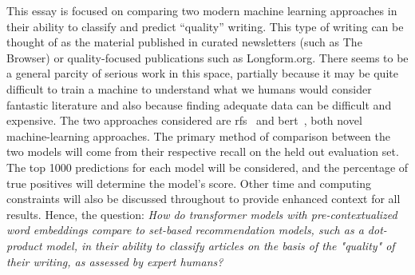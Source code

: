 This essay is focused on comparing two modern machine learning approaches in their ability to classify and predict “quality” writing. This type of writing can be thought of as the material published in curated newsletters (such as The Browser) or quality-focused publications such as Longform.org. There seems to be a general parcity of serious work in this space, partially because it may be quite difficult to train a machine to understand what we humans would consider fantastic literature and also because finding adequate data can be difficult and expensive. The two approaches considered are \gls{rfs}~\parencite{altosaar2020rankfromsets:} and \acrshort{bert}~\parencite{devlin2019bert:}, both novel machine-learning approaches. The primary method of comparison between the two models will come from their respective recall on the held out evaluation set. The top 1000 predictions for each model will be considered, and the percentage of true positives will determine the model’s score. Other time and computing constraints will also be discussed throughout to provide enhanced context for all results. Hence, the question: \emph{How do transformer models with pre-contextualized word embeddings compare to set-based recommendation models, such as a dot-product model, in their ability to classify articles on the basis of the "quality" of their writing, as assessed by expert humans?}